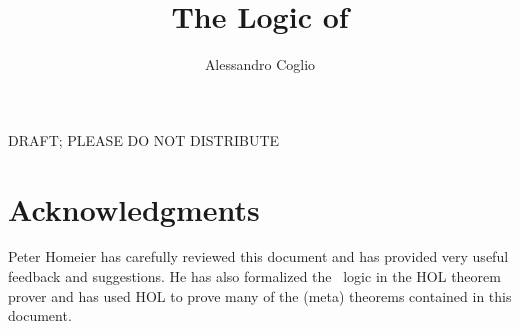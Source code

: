 \documentclass{article}
\begin{document}
\title{The Logic of \MS}
\author{Alessandro Coglio}
\maketitle

\begin{center}
{\Large DRAFT; PLEASE DO NOT DISTRIBUTE}
\end{center}







\appendix



\section*{Acknowledgments}

Peter Homeier has carefully reviewed this document and has provided very useful
feedback and suggestions. He has also formalized the \MS\ logic in the HOL
theorem prover and has used HOL to prove many of the (meta) theorems contained
in this document.

%


\end{document}
